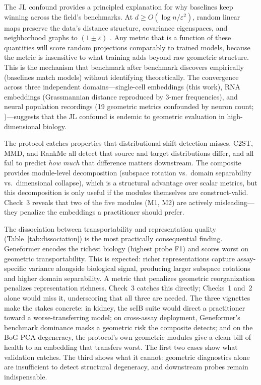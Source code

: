 \documentclass[9pt,lineno]{elife}
\begin{document}
The JL confound provides a principled explanation for why baselines keep winning across the field's benchmarks. At $d \geq O(\log n / \varepsilon^2)$, random linear maps preserve the data's distance structure, covariance eigenspaces, and neighborhood graphs to $(1 \pm \varepsilon)$ \citep{johnsonlindenstrauss1984}. Any metric that is a function of these quantities will score random projections comparably to trained models, because the metric is insensitive to what training adds beyond raw geometric structure. This is the mechanism that benchmark after benchmark discovers empirically (baselines match models) without identifying theoretically. The convergence across three independent domains---single-cell embeddings (this work), RNA embeddings (Grassmannian distance reproduced by 3-mer frequencies), and neural population recordings (19 geometric metrics confounded by neuron count; \citealp{tower2026bracket})---suggests that the JL confound is endemic to geometric evaluation in high-dimensional biology.

The protocol catches properties that distributional-shift detection misses. C2ST, MMD, and RankMe all detect that source and target distributions differ, and all fail to predict \emph{how much} that difference matters downstream. The composite provides module-level decomposition (subspace rotation vs.\ domain separability vs.\ dimensional collapse), which is a structural advantage over scalar metrics, but this decomposition is only useful if the modules themselves are construct-valid. Check~3 reveals that two of the five modules (M1, M2) are actively misleading---they penalize the embeddings a practitioner should prefer.

The dissociation between transportability and representation quality (Table~\ref{tab:dissociation}) is the most practically consequential finding. Geneformer encodes the richest biology (highest probe F1) and scores worst on geometric transportability. This is expected: richer representations capture assay-specific variance alongside biological signal, producing larger subspace rotations and higher domain separability. A metric that penalizes geometric reorganization penalizes representation richness. Check~3 catches this directly; Checks~1 and~2 alone would miss it, underscoring that all three are needed. The three vignettes make the stakes concrete: in kidney, the scIB suite would direct a practitioner toward a worse-transferring model; on cross-assay deployment, Geneformer's benchmark dominance masks a geometric risk the composite detects; and on the BoG-PCA degeneracy, the protocol's own geometric modules give a clean bill of health to an embedding that transfers worst. The first two cases show what validation catches. The third shows what it cannot: geometric diagnostics alone are insufficient to detect structural degeneracy, and downstream probes remain indispensable.
\end{document}
